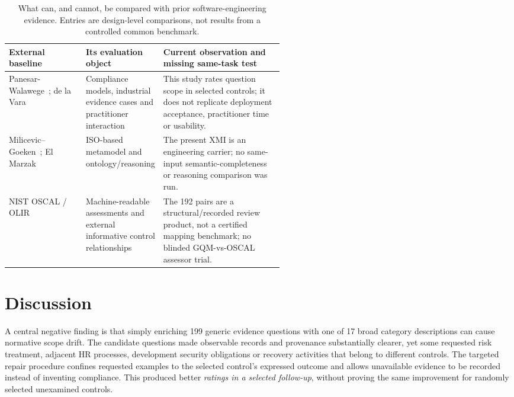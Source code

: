 \documentclass[12pt,a4paper]{article}
\begin{document}
\begin{table}[tbp]\centering\footnotesize
\caption{What can, and cannot, be compared with prior software-engineering evidence. Entries are design-level comparisons, not results from a controlled common benchmark.}\label{tab:external-contrast}
\begin{tabularx}{\linewidth}{@{}p{0.28\linewidth}p{0.26\linewidth}Y@{}}\toprule
External baseline & Its evaluation object & Current observation and missing same-task test \\\midrule
Panesar-Walawege~\cite{PanesarWalawege2013IST}; de la Vara~\cite{DelaVara2016IST,DelaVara2022SoSyM} & Compliance models, industrial evidence cases and practitioner interaction & This study rates question scope in selected controls; it does not replicate deployment acceptance, practitioner time or usability. \\
Milicevic--Goeken~\cite{MilicevicGoeken2011}; El Marzak~\cite{ElMarzak2026} & ISO-based metamodel and ontology/reasoning & The present XMI is an engineering carrier; no same-input semantic-completeness or reasoning comparison was run. \\
NIST OSCAL / OLIR~\cite{NIST_OSCAL_2026,NIST_OLIR_218} & Machine-readable assessments and external informative control relationships & The 192 pairs are a structural/recorded review product, not a certified mapping benchmark; no blinded GQM-vs-OSCAL assessor trial. \\
\bottomrule\end{tabularx}
\end{table}

\section{Discussion}\label{sec:discussion}
A central negative finding is that simply enriching 199 generic evidence questions with one of 17 broad category descriptions can cause normative scope drift. The candidate questions made observable records and provenance substantially clearer, yet some requested risk treatment, adjacent HR processes, development security obligations or recovery activities that belong to different controls. The targeted repair procedure confines requested examples to the selected control's expressed outcome and allows unavailable evidence to be recorded instead of inventing compliance. This produced better \emph{ratings in a selected follow-up}, without proving the same improvement for randomly selected unexamined controls.
\end{document}
